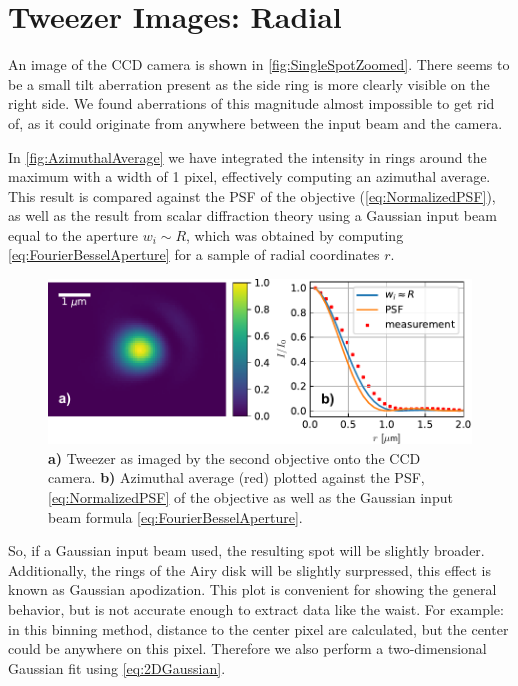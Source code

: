 \section{Tweezer Images: Radial}\label{sec:TweezerRadial}

An image of the CCD camera is shown in \cref{fig:SingleSpotZoomed}. 
There seems to be a small tilt aberration present as the side ring is more clearly visible on the right side. 
We found aberrations of this magnitude almost impossible to get rid of, as it could originate from anywhere between the input beam and the camera.

In \cref{fig:AzimuthalAverage} we have integrated the intensity in rings around the maximum with a width of 1 pixel, effectively computing an azimuthal average. 
This result is compared against the \ac{PSF} of the objective (\cref{eq:NormalizedPSF}), as well as the result from scalar diffraction theory using a Gaussian input beam equal to the aperture $w_i \sim R$, which was obtained by computing \cref{eq:FourierBesselAperture} for a sample of radial coordinates $r$. 

\begin{figure}
    \centering
    \includegraphics[width=\linewidth]{figures/AzimuthalAverageSpotZoomed.pdf}
    \caption{\textbf{a)} Tweezer as imaged by the second objective onto the CCD camera. 
	\textbf{ b)} Azimuthal average (red) plotted against the \ac{PSF}, \cref{eq:NormalizedPSF} of the objective as well as the Gaussian input beam formula \cref{eq:FourierBesselAperture}.}
    \label{fig:2Dresults}
\end{figure}


So, if a Gaussian input beam used, the resulting spot will be slightly broader.
Additionally, the rings of the Airy disk will be slightly surpressed, this effect is known as Gaussian apodization.
This plot is convenient for showing the general behavior, but is not accurate enough to extract data like the waist. 
For example: in this binning method, distance to the center pixel are calculated, but the center could be anywhere on this pixel. 
Therefore we also perform a two-dimensional Gaussian fit using \cref{eq:2DGaussian}.

